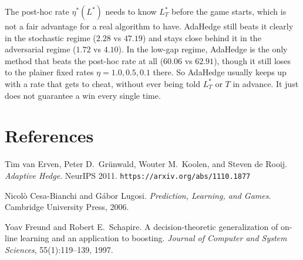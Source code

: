 \documentclass[11pt,a4paper]{article}
\newcommand{\Lstar}{L_T^*}
\begin{document}
The post-hoc rate $\eta^*(L^*)$ needs to know $\Lstar$ before the game
starts, which is not a fair advantage for a real algorithm to have. AdaHedge
still beats it clearly in the stochastic regime ($2.28$ vs $47.19$) and stays
close behind it in the adversarial regime ($1.72$ vs $4.10$). In the low-gap
regime, AdaHedge is the only method that beats the post-hoc rate at all
($60.06$ vs $62.91$), though it still loses to the plainer fixed rates
$\eta=1.0, 0.5, 0.1$ there. So AdaHedge usually keeps up with a rate that
gets to cheat, without ever being told $\Lstar$ or $T$ in advance. It just
does not guarantee a win every single time.

\section*{References}

\small
\begin{enumerate}[label={[\arabic*]}, leftmargin=2em, itemsep=2pt, parsep=0pt, topsep=4pt]
  \item Tim van Erven, Peter D.\ Gr\"{u}nwald, Wouter M.\ Koolen, and Steven de Rooij.
        \textit{Adaptive Hedge}.
        NeurIPS 2011.
        \texttt{https://arxiv.org/abs/1110.1877}
  \item Nicol\`{o} Cesa-Bianchi and G\'{a}bor Lugosi.
        \textit{Prediction, Learning, and Games}.
        Cambridge University Press, 2006.
  \item Yoav Freund and Robert E.\ Schapire.
        A decision-theoretic generalization of on-line learning and an application to boosting.
        \textit{Journal of Computer and System Sciences}, 55(1):119--139, 1997.
\end{enumerate}

\end{document}
